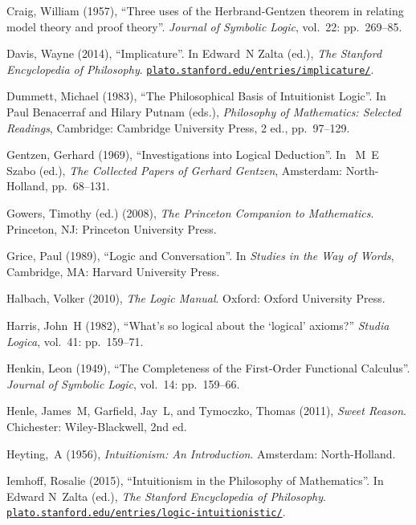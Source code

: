\documentclass[openany,leqno,11pt,draft]{book}
\theoremstyle{break}
\theoremstyle{definition}
\theoremstyle{remark}
\begin{document}
{\begin{thebibliography}{39}
Craig, William (1957), \enquote{Three uses of the Herbrand-Gentzen theorem in
  relating model theory and proof theory}. \emph{Journal of Symbolic Logic},
  vol.~22: pp.~269–85.

Davis, Wayne (2014), \enquote{Implicature}. In Edward~N Zalta (ed.), \emph{The Stanford Encyclopedia of Philosophy}. \urlprefix\href{http://plato.stanford.edu/entries/implicature/}{\nolinkurl{plato.stanford.edu/entries/implicature/}}.

Dummett, Michael (1983), \enquote{The Philosophical Basis of Intuitionist
  Logic}. In Paul Benacerraf and Hilary Putnam (eds.), \emph{Philosophy of
  Mathematics: Selected Readings}, Cambridge: Cambridge University Press, 2
  ed., pp.~97–129.

Gentzen, Gerhard (1969), \enquote{Investigations into Logical Deduction}. In
 ~M~E Szabo (ed.), \emph{The Collected Papers of Gerhard Gentzen},
  Amsterdam: North-Holland, pp.~68–131.

Gowers, Timothy (ed.) (2008), \emph{The Princeton Companion to Mathematics}. Princeton, NJ: Princeton University Press.

Grice, Paul (1989), \enquote{Logic and Conversation}. In \emph{Studies in the
  Way of Words}, Cambridge, MA: Harvard University Press.

Halbach, Volker (2010), \emph{The Logic Manual}. Oxford: Oxford University
  Press.

Harris, John~H (1982), \enquote{What's so logical about the `logical' axioms?}
  \emph{Studia Logica}, vol.~41: pp.~159–71.

Henkin, Leon (1949), \enquote{The Completeness of the First-Order Functional
  Calculus}. \emph{Journal of Symbolic Logic}, vol.~14: pp.~159–66.

Henle, James~M, Garfield, Jay~L, and Tymoczko, Thomas (2011), \emph{Sweet Reason}. Chichester: Wiley-Blackwell, 2nd ed.


Heyting,~A (1956), \emph{Intuitionism: An Introduction}. Amsterdam:
  North-Holland.

 Iemhoff, Rosalie (2015), \enquote{Intuitionism in the Philosophy of Mathematics}. In Edward N~Zalta (ed.), \emph{The Stanford Encyclopedia of Philosophy}. \href{http://plato.stanford.edu/entries/logic-intuitionistic/}{\nolinkurl{plato.stanford.edu/entries/logic-intuitionistic/}}.


\end{thebibliography}}
\end{document}
